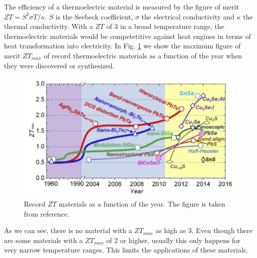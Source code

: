 The efficiency of a thermoelectric material is measured by the figure of merit $ZT=S^{2}\sigma T/\kappa$. $S$ is the
Seebeck coefficient, $\sigma$ the electrical conductivity and $\kappa$ the thermal conductivity. With a $ZT$ of 3 
in a broad temperature range, the thermoelectric materials would be competetitive against heat engines in terms of
heat transformation into electricity\cite{zhang2015thermoelectric}. In Fig. \ref{ztvst} we show the maximum figure 
of merit $ZT_{max}$ of record thermoelectric materials as a function of the year when they were discovered or 
synthesized.
\begin{figure}[h]
\begin{center}
\includegraphics[width=0.9\linewidth]{Figures/ztvstemp.png}
\caption[Record $ZT$ materials]{Record $ZT$ materials as a function of the year. The figure is taken from 
reference\cite{zhang2015thermoelectric}.}
\label{ztvst}
\end{center}
\end{figure}
As we can see, there is no material with a $ZT_{max}$ as high as 3. Even though there are some materials with a 
$ZT_{max}$ of 2 or higher, usually this only happens for very narrow temperature ranges\cite{zhao2014ultralow}. This 
limits the applications of these materials. \\

